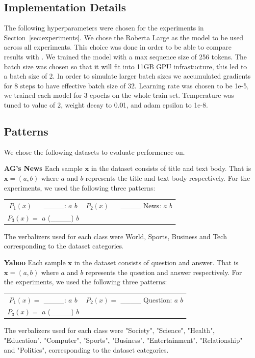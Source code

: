 \documentclass[11pt,a4paper]{article}
\begin{document}
\subsection{Implementation Details}
\label{apx:implementation-details}
The following hyperparameters were chosen for the experiments in Section~\ref{sec:experiments}.
We chose the Roberta Large as the model to be used across all experiments.
This choice was done in order to be able to compare results with \citet{schick2020exploiting}.
We trained the model with a max sequence size of 256 tokens.
The batch size was chosen so that it will fit into 11GB GPU infrastucture, this led to a batch size of 2. 
In order to simulate larger batch sizes we accumulated gradients for 8 steps to have effective batch size of 32.
Learning rate was chosen to be 1e-5, we trained each model for 3 epochs on the whole train set.
Temperature was tuned to value of 2, weight decay to 0.01, and adam epsilon to 1e-8.

\subsection{Patterns}
\label{apx:patterns}
We chose the following datasets to evaluate performence on.

\vspace{8pt}
\noindent \textbf{AG's News} \quad
Each sample $\textbf{x}$ in the dataset consists of title and text body.
That is $\textbf{x}=(a, b)$ where $a$ and $b$ represents the title and text body respectively.
For the experiments, we used the following three patterns:
\begin{table}[H]
	\renewcommand{\arraystretch}{1.5}
	\begin{tabularx}{\textwidth}{cc}
		 $P_1(x)=$ \_\_\_\_: $a$ $b$ & $P_2(x)=$ \_\_\_\_ News: $a$ $b$ \\
		 $P_3(x)=$ $a$ (\_\_\_\_) $b$ &  \\
	\end{tabularx}
\end{table}
The verbalizers used for each class were World, Sports, Business and Tech corresponding to the dataset categories.

\vspace{8pt}
\noindent \textbf{Yahoo} \quad
Each sample $\textbf{x}$ in the dataset consists of question and answer.
That is $\textbf{x}=(a, b)$ where $a$ and $b$ represents the question and answer respectively.
For the experiments, we used the following three patterns:
\begin{table}[H]
	\renewcommand{\arraystretch}{1.5}
	\begin{tabularx}{\textwidth}{cc}
		$P_1(x)=$ \_\_\_\_: $a$ $b$ & $P_2(x)=$ \_\_\_\_ Question: $a$ $b$ \\
		$P_3(x)=$ $a$ (\_\_\_\_) $b$ &  \\
	\end{tabularx}
\end{table}
The verbalizers used for each class were "Society", "Science", "Health", "Education", "Computer", "Sports", "Business", "Entertainment", "Relationship" and "Politics", corresponding to the dataset categories.
\end{document}
